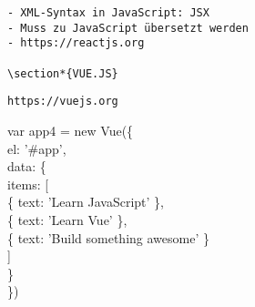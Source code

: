 \begin{verbatim}
- XML-Syntax in JavaScript: JSX
- Muss zu JavaScript übersetzt werden
- https://reactjs.org

\section*{VUE.JS}
\end{verbatim}

\begin{verbatim}
https://vuejs.org
\end{verbatim}

var app4 = new Vue(\{\\
el: '\#app',\\
data: \{\\
items: [\\
\{ text: 'Learn JavaScript' \},\\
\{ text: 'Learn Vue' \},\\
\{ text: 'Build something awesome' \}\\[0pt]
]\\
\}\\
\})

